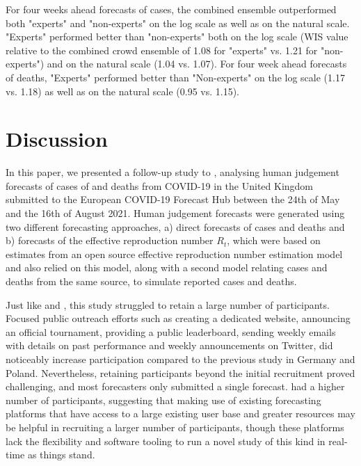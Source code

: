 \documentclass[10pt,a4paper,twocolumn]{article}
\begin{document}
For four weeks ahead forecasts of cases, the combined ensemble outperformed both "experts" and "non-experts" on the log scale as well as on the natural scale. "Experts" performed better than "non-experts" both on the log scale (WIS value relative to the combined crowd ensemble of 1.08 for "experts" vs. 1.21 for "non-experts") and on the natural scale (1.04 vs. 1.07). For four week ahead forecasts of deaths, "Experts" performed better than "Non-experts" on the log scale (1.17 vs. 1.18) as well as on the natural scale (0.95 vs. 1.15). 

\section*{Discussion}

In this paper, we presented a follow-up study to \cite{bosseComparingHumanModelbased2022}, analysing human judgement forecasts of cases of and deaths from COVID-19 in the United Kingdom submitted to the European COVID-19 Forecast Hub between the 24th of May and the 16th of August 2021. Human judgement forecasts were generated using two different forecasting approaches, a) direct forecasts of cases and deaths and b) forecasts of the effective reproduction number $R_t$, which were based on estimates from an open source effective reproduction number estimation model and also relied on this model, along with a second model relating cases and deaths from the same source, to simulate reported cases and deaths. 

Just like \citet{bosseComparingHumanModelbased2022} and \citet{farrowHumanJudgmentApproach2017}, this study struggled to retain a large number of participants. Focused public outreach efforts such as creating a dedicated website, announcing an official tournament, providing a public leaderboard, sending weekly emails with details on past performance and weekly announcements on Twitter, did noticeably increase participation compared to the previous study in Germany and Poland. Nevertheless, retaining participants beyond the initial recruitment proved challenging, and most forecasters only submitted a single forecast. \citet{mcandrewChimericForecastingCombining2022} had a higher number of participants, suggesting that making use of existing forecasting platforms that have access to a large existing user base and greater resources may be helpful in recruiting a larger number of participants, though these platforms lack the flexibility and software tooling to run a novel study of this kind in real-time as things stand.
\end{document}
